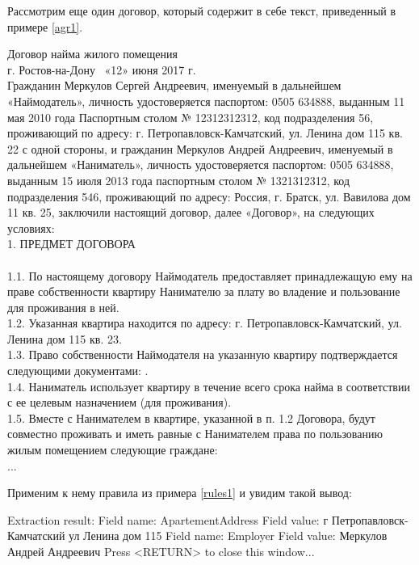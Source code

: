 Рассмотрим еще один договор, который содержит в себе текст, приведенный в примере \ref{agr1}.
\begin{myexample}
\label{agr1}
Договор найма жилого помещения\\

г. Ростов-на-Дону \                                                        «12» июня 2017 г.\\

     Гражданин Меркулов Сергей Андреевич, именуемый в дальнейшем «Наймодатель»,  личность  удостоверяется  паспортом: 0505  634888, выданным 11 мая 2010 года Паспортным столом № 12312312312, код подразделения 56, проживающий по адресу: г. Петропавловск-Камчатский, ул. Ленина дом 115 кв. 22 с одной стороны, и гражданин Меркулов Андрей Андреевич, именуемый в дальнейшем «Наниматель»,  личность  удостоверяется  паспортом:   0505  634888,  выданным 15 июля 2013 года паспортным столом № 1321312312, код подразделения 546, проживающий по адресу: Россия, г. Братск, ул. Вавилова дом 11 кв. 25, заключили настоящий договор, далее «Договор»,  на следующих условиях:\\

1. ПРЕДМЕТ ДОГОВОРА\\
\\
1.1. По настоящему договору Наймодатель предоставляет принадлежащую ему на праве собственности квартиру Нанимателю за плату во владение и пользование для проживания в ней.\\
1.2. Указанная квартира находится по адресу: г. Петропавловск-Камчатский, ул. Ленина дом 115 кв. 23.\\
1.3. Право собственности Наймодателя на указанную квартиру подтверждается следующими документами: .\\
1.4. Наниматель использует квартиру в течение всего срока найма в соответствии с ее целевым назначением (для проживания).\\
1.5. Вместе с Нанимателем в квартире, указанной в п. 1.2 Договора, будут совместно проживать и иметь равные с Нанимателем права по пользованию жилым помещением следующие граждане:\\
...
\end{myexample}
Применим к нему правила из примера \ref{rules1} и увидим такой вывод:
\begin{Verb}
Extraction result:
Field name: ApartementAddress
Field value: г Петропавловск-Камчатский ул Ленина дом 115 
Field name: Employer
Field value: Меркулов Андрей Андреевич 
Press <RETURN> to close this window...
\end{Verb}


